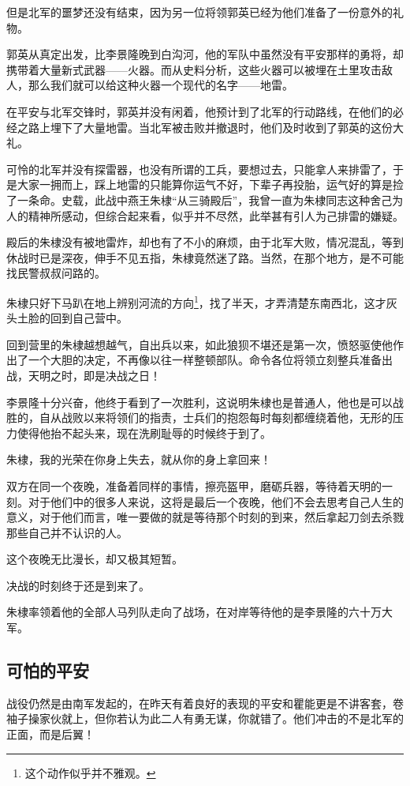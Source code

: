 \begin{multicols}{\theparacolNo}
		但是北军的噩梦还没有结束，因为另一位将领郭英已经为他们准备了一份意外的礼物。

		郭英从真定出发，比李景隆晚到白沟河，他的军队中虽然没有平安那样的勇将，却携带着大量新式武器——火器。而从史料分析，这些火器可以被埋在土里攻击敌人，那么我们就可以给这种火器一个现代的名字——地雷。

		在平安与北军交锋时，郭英并没有闲着，他预计到了北军的行动路线，在他们的必经之路上埋下了大量地雷。当北军被击败并撤退时，他们及时收到了郭英的这份大礼。

		可怜的北军并没有探雷器，也没有所谓的工兵，要想过去，只能拿人来排雷了，于是大家一拥而上，踩上地雷的只能算你运气不好，下辈子再投胎，运气好的算是捡了一条命。史载，此战中燕王朱棣“从三骑殿后”，我曾一直为朱棣同志这种舍己为人的精神所感动，但综合起来看，似乎并不尽然，此举甚有引人为己排雷的嫌疑。

		殿后的朱棣没有被地雷炸，却也有了不小的麻烦，由于北军大败，情况混乱，等到休战时已是深夜，伸手不见五指，朱棣竟然迷了路。当然，在那个地方，是不可能找民警叔叔问路的。

		朱棣只好下马趴在地上辨别河流的方向\footnote{这个动作似乎并不雅观。}，找了半天，才弄清楚东南西北，这才灰头土脸的回到自己营中。

		回到营里的朱棣越想越气，自出兵以来，如此狼狈不堪还是第一次，愤怒驱使他作出了一个大胆的决定，不再像以往一样整顿部队。命令各位将领立刻整兵准备出战，天明之时，即是决战之日！

		李景隆十分兴奋，他终于看到了一次胜利，这说明朱棣也是普通人，他也是可以战胜的，自从战败以来将领们的指责，士兵们的抱怨每时每刻都缠绕着他，无形的压力使得他抬不起头来，现在洗刷耻辱的时候终于到了。

		朱棣，我的光荣在你身上失去，就从你的身上拿回来！

		双方在同一个夜晚，准备着同样的事情，擦亮盔甲，磨砺兵器，等待着天明的一刻。对于他们中的很多人来说，这将是最后一个夜晚，他们不会去思考自己人生的意义，对于他们而言，唯一要做的就是等待那个时刻的到来，然后拿起刀剑去杀戮那些自己并不认识的人。

		这个夜晚无比漫长，却又极其短暂。

		决战的时刻终于还是到来了。

		朱棣率领着他的全部人马列队走向了战场，在对岸等待他的是李景隆的六十万大军。

		\subsection{可怕的平安}
		战役仍然是由南军发起的，在昨天有着良好的表现的平安和瞿能更是不讲客套，卷袖子操家伙就上，但你若认为此二人有勇无谋，你就错了。他们冲击的不是北军的正面，而是后翼！


\end{multicols}
